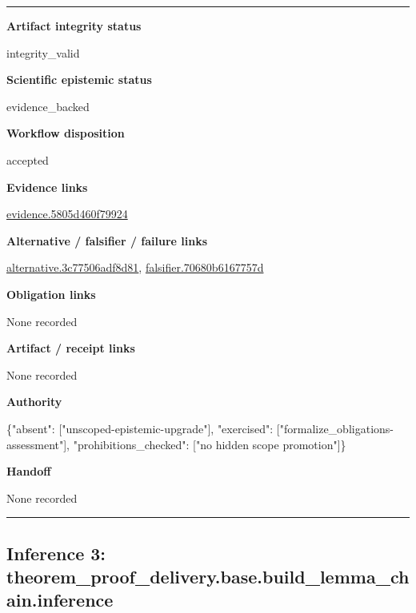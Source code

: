 \documentclass[10pt,a4paper]{article}
\newcommand{\TraceField}[2]{\par\noindent\textbf{#1}\par\noindent #2\par\smallskip}
\newenvironment{TraceDossier}{\par\medskip\noindent\hrule\medskip}{\medskip\hrule\par\medskip}
\begin{document}
\begin{TraceDossier}
\TraceField{Artifact integrity status}{integrity\_\allowbreak{}valid}

\TraceField{Scientific epistemic status}{evidence\_\allowbreak{}backed}

\TraceField{Workflow disposition}{accepted}

\TraceField{Evidence links}{\hyperlink{trace-evidence-b4798b5569665f1939}{evidence.\allowbreak{}5805d460f7\allowbreak{}9924}}

\TraceField{Alternative / falsifier / failure links}{\hyperlink{trace-alternative-3e829b12a47819072e}{alternativ\allowbreak{}e.\allowbreak{}3c77506adf\allowbreak{}8d81}, \hyperlink{trace-alternative-3c19f4e26a370c9b4a}{falsifier.\allowbreak{}70680b6167\allowbreak{}757d}}

\TraceField{Obligation links}{None recorded}

\TraceField{Artifact / receipt links}{None recorded}

\TraceField{Authority}{\{"absent":\allowbreak{} ["unscoped\allowbreak{}-\allowbreak{}epistemic-\allowbreak{}upgrade"],\allowbreak{} "exercised\allowbreak{}":\allowbreak{} ["formaliz\allowbreak{}e\_\allowbreak{}obligation\allowbreak{}s-\allowbreak{}assessment\allowbreak{}"], "prohibiti\allowbreak{}ons\_\allowbreak{}checked":\allowbreak{} ["no hidden scope promotion"\allowbreak{}]\}}

\TraceField{Handoff}{None recorded}

\end{TraceDossier}
\pagebreak[2]\subsection{Inference 3: theorem\_\allowbreak{}proof\_\allowbreak{}delivery.\allowbreak{}base.\allowbreak{}build\_\allowbreak{}lemma\_\allowbreak{}chain.\allowbreak{}inference}\label{trace-inference-6cb1703ea655744d16}
\end{document}
